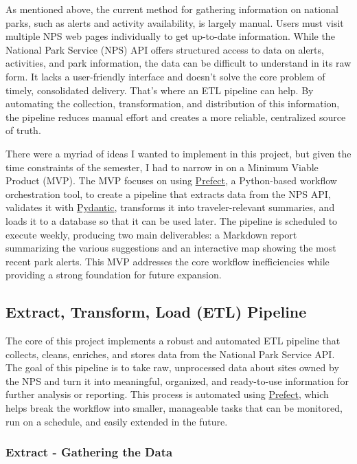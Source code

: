 \documentclass[
  letterpaper,
  DIV=11,
  numbers=noendperiod]{scrartcl}
\begin{document}
As mentioned above, the current method for gathering information on
national parks, such as alerts and activity availability, is largely
manual. Users must visit multiple NPS web pages individually to get
up-to-date information. While the National Park Service (NPS) API offers
structured access to data on alerts, activities, and park information,
the data can be difficult to understand in its raw form. It lacks a
user-friendly interface and doesn't solve the core problem of timely,
consolidated delivery. That's where an ETL pipeline can help. By
automating the collection, transformation, and distribution of this
information, the pipeline reduces manual effort and creates a more
reliable, centralized source of truth.

There were a myriad of ideas I wanted to implement in this project, but
given the time constraints of the semester, I had to narrow in on a
Minimum Viable Product (MVP). The MVP focuses on using
\href{https://www.prefect.io/}{Prefect}, a Python-based workflow
orchestration tool, to create a pipeline that extracts data from the NPS
API, validates it with
\href{https://docs.pydantic.dev/latest/}{Pydantic}, transforms it into
traveler-relevant summaries, and loads it to a database so that it can
be used later. The pipeline is scheduled to execute weekly, producing
two main deliverables: a Markdown report summarizing the various
suggestions and an interactive map showing the most recent park alerts.
This MVP addresses the core workflow inefficiencies while providing a
strong foundation for future expansion.

\subsection{Extract, Transform, Load (ETL)
Pipeline}\label{extract-transform-load-etl-pipeline}

The core of this project implements a robust and automated ETL pipeline
that collects, cleans, enriches, and stores data from the National Park
Service API. The goal of this pipeline is to take raw, unprocessed data
about sites owned by the NPS and turn it into meaningful, organized, and
ready-to-use information for further analysis or reporting. This process
is automated using \href{https://www.prefect.io/}{Prefect}, which helps
break the workflow into smaller, manageable tasks that can be monitored,
run on a schedule, and easily extended in the future.

\subsubsection{Extract - Gathering the
Data}\label{extract---gathering-the-data}
\end{document}
